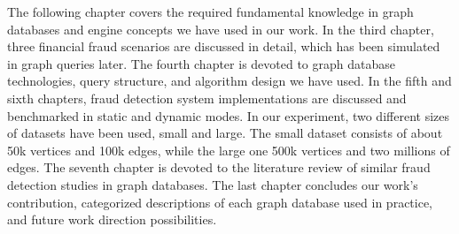 The following chapter covers the required fundamental knowledge in graph databases and engine concepts we have used in our work.
In the third chapter, three financial fraud scenarios are discussed in detail, which has been simulated in graph queries later.
The fourth chapter is devoted to graph database technologies, query structure, and algorithm design we have used.
In the fifth and sixth chapters, fraud detection system implementations are discussed and benchmarked in static and dynamic modes.
In our experiment, two different sizes of datasets have been used, small and large. The small dataset consists of about 50k vertices and 100k edges, while the large one 500k vertices and two millions of edges.
The seventh chapter is devoted to the literature review of similar fraud detection studies in graph databases.
The last chapter concludes our work's contribution, categorized descriptions of each graph database used in practice, and future work direction possibilities.